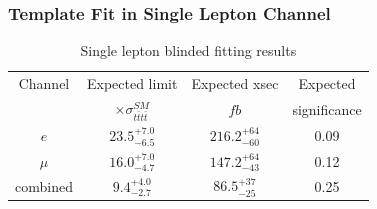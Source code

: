 \documentclass{beamer}
\begin{document}

\begin{frame}
\frametitle{Template Fit in Single Lepton Channel}
\vspace{-10pt}
\begin{table}
\caption{Single lepton blinded fitting results}
\vspace{0pt} 
\begin{tabular}{| c | c | c | c |}
\hline
Channel	&Expected limit	&Expected xsec	&Expected \\
 & $\times \sigma_{t\bar{t}t\bar{t}}^{SM}$ &  $fb$ &significance \\
\hline
$e$			& $23.5^{+7.0}_{-6.5}$ & $216.2^{+64}_{-60}$ &  0.09\\
\hline
$\mu$		& $16.0^{+7.0}_{-4.7}$ & $147.2^{+64}_{-43}$ &  0.12 \\
\hline
combined	& $9.4^{+4.0}_{-2.7}$ & $86.5^{+37}_{-25}$ & 0.25 \\
\hline
\end{tabular} 
\end{table}
\end{frame}

\end{document}
